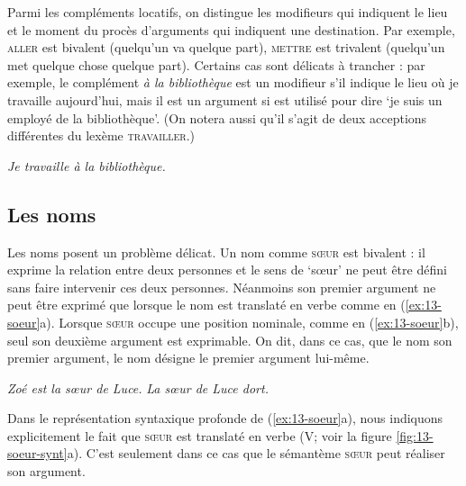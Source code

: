 Parmi les compléments locatifs, on distingue les modifieurs qui indiquent le lieu et le moment du procès d’arguments qui indiquent une destination. Par exemple, \textsc{aller} est bivalent (quelqu’un va quelque part), \textsc{mettre} est trivalent (quelqu’un met quelque chose quelque part). Certains cas sont délicats à trancher : par exemple, le complément \textit{à la bibliothèque} est un modifieur s’il indique le lieu où je travaille aujourd’hui, mais il est un argument si  est utilisé pour dire ‘je suis un employé de la bibliothèque’. (On notera aussi qu'il s'agit de deux acceptions différentes du lexème \textsc{travailler}.)

\ea\label{ex:travailler} \textit{Je travaille à la bibliothèque.}\z

\subsection{Les noms} 
Les noms posent un problème délicat. Un nom comme \textsc{sœur} est bivalent : il exprime la relation entre deux personnes et le sens de ‘sœur’ ne peut être défini sans faire intervenir ces deux personnes. Néanmoins son premier argument ne peut être exprimé que lorsque le nom est translaté en verbe comme en (\ref{ex:13-soeur}a). Lorsque \textsc{sœur} occupe une position nominale, comme en  (\ref{ex:13-soeur}b), seul son deuxième argument est exprimable. On dit, dans ce cas, que le nom  son premier argument, le nom désigne le premier argument lui-même.

\ea\label{ex:13-soeur}
\ea \textit{Zoé est la sœur de Luce.}
\ex \textit{La sœur de Luce dort.}\z\z

Dans le représentation syntaxique profonde de (\ref{ex:13-soeur}a), nous indiquons explicitement le fait que \textsc{sœur} est translaté en verbe (V; voir la figure \ref{fig:13-soeur-synt}a). C'est seulement dans ce cas que le sémantème \textsc{sœur} peut réaliser son argument.

